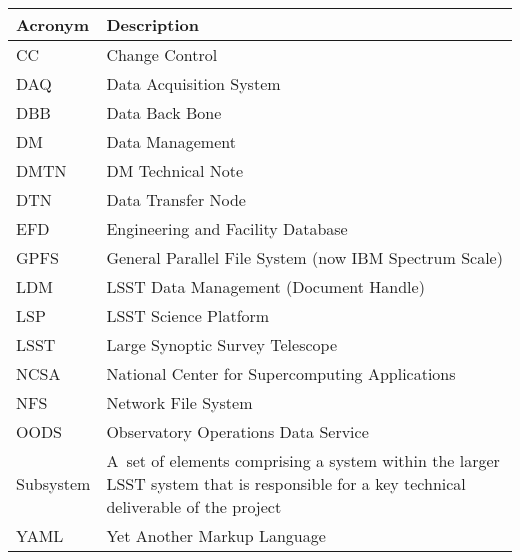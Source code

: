 \addtocounter{table}{-1}
\begin{longtable}{|p{}|p{}|}\hline
\textbf{Acronym} & \textbf{Description}  \\\hline

CC & Change Control \\\hline
DAQ & Data Acquisition System \\\hline
DBB & Data Back Bone \\\hline
DM & Data Management \\\hline
DMTN & DM Technical Note \\\hline
DTN & Data Transfer Node \\\hline
EFD & Engineering and Facility Database \\\hline
GPFS & General Parallel File System (now IBM Spectrum Scale) \\\hline
LDM & LSST Data Management (Document Handle) \\\hline
LSP & LSST Science Platform \\\hline
LSST & Large Synoptic Survey Telescope \\\hline
NCSA & National Center for Supercomputing Applications \\\hline
NFS & Network File System \\\hline
OODS & Observatory Operations Data Service \\\hline
Subsystem & A set of elements comprising a system within the larger LSST system that is responsible for a key technical deliverable of the project \\\hline
YAML & Yet Another Markup Language \\\hline
\end{longtable}
